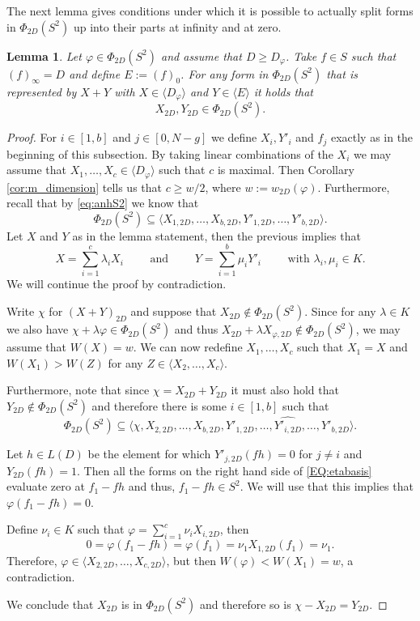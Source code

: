 \documentclass[12pt]{amsart}
\renewcommand{\geq}{\geqslant}
\newtheorem{lemma}[theorem]{Lemma}
\theoremstyle{definition}
\newcommand{\divi}[1]{\langle #1 \rangle}
\begin{document}
	The next lemma gives conditions under which it is possible to actually split forms in $\Phi_{2D}(S^2)$ up into their parts at infinity and at zero. 
	\begin{lemma}\label{lem:dis}
		Let $\varphi \in \Phi_{2D}(S^2)$ and assume that $D \geq D_\varphi$. Take $f \in S$ such that $(f)_\infty = D$ and define $E := (f)_0$. For any form in $\Phi_{2D}(S^2)$ that is represented by $X+Y$ with $X \in \divi {D_\varphi}$ and $Y \in \divi E$ it holds that $$X_{2D}, Y_{2D} \in \Phi_{2D}(S^2).$$
	\end{lemma}
	\begin{proof}
		For $i \in [1, b]$ and $j \in [0, N-g]$ we define $X_i, Y'_i$ and $f_j$ exactly as in the beginning of this subsection. By taking linear combinations of the $X_i$ we may assume that $X_1, \ldots, X_c \in \divi {D_\varphi}$ such that $c$ is maximal. Then Corollary \ref{cor:m_dimension} tells us that $c \geq w/2$, where $w:= w_{2D}(\varphi)$. Furthermore, recall that by \eqref{eq:anhS2} we know that
		$$\Phi_{2D}(S^2) \subseteq  \langle X_{1, 2D}, \ldots, X_{b, 2D}, Y'_{1, 2D}, \ldots, Y'_{b, 2D} \rangle.$$ 
		Let $X$ and $Y$ as in the lemma statement, then the previous implies that 
		$$X = \sum_{i=1}^c \lambda_i X_i \qquad \text{ and } \qquad Y = \sum_{i=1}^{b} \mu_iY'_i \qquad \text{ with } \lambda_i, \mu_i \in K.$$ We will continue the proof by contradiction.
		
		Write $\chi$ for $(X+Y)_{2D}$ and suppose that $X_{2D} \not\in \Phi_{2D}(S^2)$. Since for any $\lambda \in K$ we also have $\chi + \lambda \varphi \in \Phi_{2D}(S^2)$ and thus $X_{2D} + \lambda X_{\varphi, 2D} \not\in \Phi_{2D}(S^2)$, we may assume that $W(X) = w$. We can now redefine $X_1, \ldots, X_c$ such that $X_1 = X$ and $W(X_1) > W(Z)$ for any $Z \in \langle X_2, \ldots, X_c \rangle$. 
		
		Furthermore, note that since $\chi = X_{2D} + Y_{2D}$ it must also hold that $Y_{2D} \not\in \Phi_{2D}(S^2)$ and therefore there is some $i \in [1, b]$ such that \begin{equation}\label{EQ:etabasis}
			\Phi_{2D}(S^2) \subseteq \langle \chi, X_{2, 2D}, \ldots, X_{b, 2D}, Y'_{1, 2D}, \ldots, \widehat{Y'_{i, 2D}}, \ldots, Y'_{b, 2D} \rangle.
		\end{equation}
		
		Let $h \in L(D)$ be the element for which $Y'_{j, 2D}(fh) = 0$ for $j \neq i$ and $Y_{2D}(fh) = 1$. Then all the forms on the right hand side of \eqref{EQ:etabasis} evaluate zero at $f_1 - fh$ and thus, $f_1 - fh \in S^2$. We will use that this implies that $\varphi(f_1-fh) = 0$.  
		
		Define $\nu_i \in K$ such that $\varphi = \sum_{i=1}^c \nu_i X_{i, 2D}$, then
		$$0 = \varphi (f_1 - fh) = \varphi (f_1) = \nu_1 X_{1, 2D}(f_1) = \nu_1.$$ 
		Therefore, $\varphi \in \langle X_{2, 2D}, \ldots, X_{c, 2D} \rangle$, but then $W(\varphi) < W(X_{1}) = w$, a contradiction. 
		
		We conclude that $X_{2D}$ is in $\Phi_{2D}(S^2)$ and therefore so is $\chi - X_{2D} = Y_{2D}$. 
	\end{proof}
	
\end{document}
